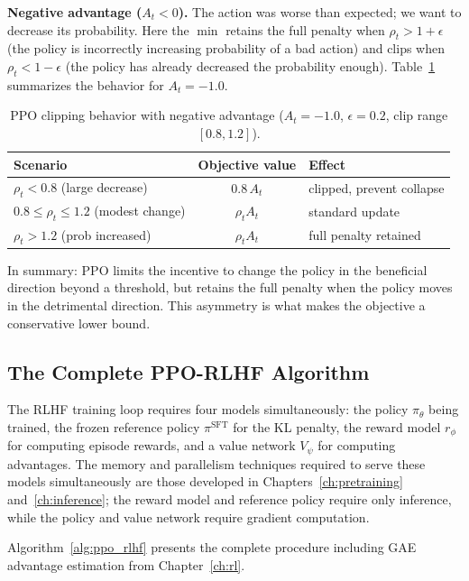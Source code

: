 \documentclass{book}
\begin{document}
\textbf{Negative advantage ($A_t < 0$).} The action was worse than
expected; we want to decrease its probability. Here the $\min$ retains the
full penalty when $\rho_t > 1 + \epsilon$ (the policy is incorrectly
increasing probability of a bad action) and clips when $\rho_t <
1 - \epsilon$ (the policy has already decreased the probability enough).
Table~\ref{tab:ppo_negative} summarizes the behavior for $A_t = -1.0$.

\begin{table}[htbp]
\centering
\caption{PPO clipping behavior with negative advantage ($A_t = -1.0$,
    $\epsilon = 0.2$, clip range $[0.8, 1.2]$).}
\label{tab:ppo_negative}
\renewcommand{\arraystretch}{1.2}
\begin{tabular}{lcl}
\hline
\textbf{Scenario} & \textbf{Objective value} & \textbf{Effect} \\
\hline
$\rho_t < 0.8$ (large decrease)          & $0.8\, A_t$    & clipped, prevent collapse \\
$0.8 \le \rho_t \le 1.2$ (modest change) & $\rho_t A_t$   & standard update \\
$\rho_t > 1.2$ (prob increased)          & $\rho_t A_t$   & full penalty retained \\
\hline
\end{tabular}
\end{table}

In summary: PPO limits the incentive to change the policy in the
beneficial direction beyond a threshold, but retains the full penalty
when the policy moves in the detrimental direction. This asymmetry is
what makes the objective a conservative lower bound.

\subsection{The Complete PPO-RLHF Algorithm}
\label{sec:ppo_algorithm}

The RLHF training loop requires four models simultaneously: the policy
$\pi_\theta$ being trained, the frozen reference policy $\pi^{\text{SFT}}$
for the KL penalty, the reward model $r_\phi$ for computing episode
rewards, and a value network $V_\psi$ for computing advantages. The memory
and parallelism techniques required to serve these models simultaneously
are those developed in Chapters~\ref{ch:pretraining} and~\ref{ch:inference};
the reward model and reference policy require only inference, while the
policy and value network require gradient computation.

Algorithm~\ref{alg:ppo_rlhf} presents the complete procedure including
GAE advantage estimation from Chapter~\ref{ch:rl}.
\end{document}
